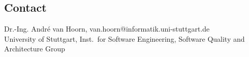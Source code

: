 \documentclass[a4paper,12pt]{article}
\begin{document}
\begin{scriptsize}


\end{scriptsize}
\enlargethispage*{2cm}
\subsection*{Contact}
Dr.-Ing. André van Hoorn, van.hoorn@informatik.uni-stuttgart.de \\
University of Stuttgart, Inst.\ for Software Engineering, Software Quality and Architecture Group \\
\end{document}
